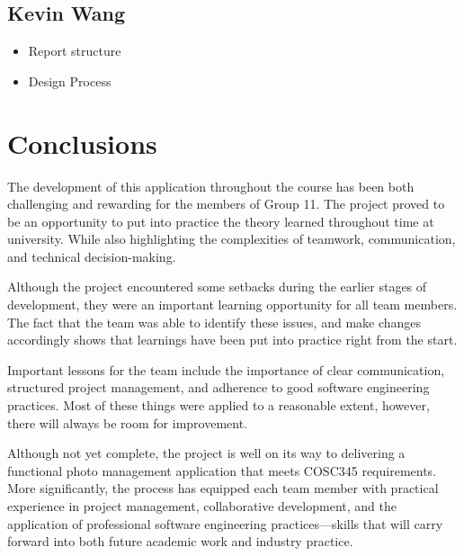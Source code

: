 \documentclass[conference]{IEEEtran}
\begin{document}
\subsection{Kevin Wang}
\begin{itemize}
    \item Report structure
    \item Design Process
\end{itemize}

\section{Conclusions}
The development of this application throughout the course has been both challenging and rewarding for the members of Group 11. The project proved to be an opportunity to put into practice the theory learned throughout time at university. While also highlighting the complexities of teamwork, communication, and technical decision-making.

Although the project encountered some setbacks during the earlier stages of development, they were an important learning opportunity for all team members. The fact that the team was able to identify these issues, and make changes accordingly shows that learnings have been put into practice right from the start.

Important lessons for the team include the importance of clear communication, structured project management, and adherence to good software engineering practices. Most of these things were applied to a reasonable extent, however, there will always be room for improvement.

Although not yet complete, the project is well on its way to delivering a functional photo management application that meets COSC345 requirements. More significantly, the process has equipped each team member with practical experience in project management, collaborative development, and the application of professional software engineering practices—skills that will carry forward into both future academic work and industry practice.
\end{document}
